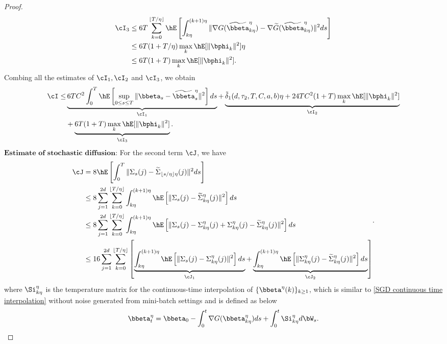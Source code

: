 \begin{proof}
\begin{equation}
    \begin{split}
   \cI_3  &\le  6T\sum_{k=0}^{\lfloor T/\eta \rfloor} \hE\left[\int_{k\eta}^{(k+1)\eta}\|\nabla  G(\widetilde \bbeta^{\eta}_{k\eta})-\nabla \widetilde G(\widetilde \bbeta^{\eta}_{k\eta})\|^2ds \right]\\
   &\le 6T (1+T/\eta)\max_{k}\hE[ \|\bphi_k\|^2]\eta\\
   &\le 6T (1+T)\max_{k}\hE[ \|\bphi_k\|^2].
    \end{split}{}
\end{equation}{}
Combing all the estimates of $\cI_1,\cI_2$ and $\cI_3$, we obtain
\begin{equation}
    \begin{split}
        \cI\le& \underbrace{6TC^2\int_0^T\hE\left[\sup_{0\le s\le T}\|\bbeta_s-\widetilde \bbeta^{\eta}_s\|^2\right]ds}_{\cI_1}+\underbrace{\tilde \delta_1(d, \tau_2, T, C, a, b) \eta+ 24TC^2(1+T)\max_{k}\hE[\|\bphi_k\|^2]}_{\cI_2}\\
        &+\underbrace{6T (1+T)\max_{k}\hE[ \|\bphi_k\|^2]}_{\cI_3}.\\
    \end{split}{}
\end{equation}{}
\noindent
$\textbf{Estimate of stochastic diffusion:}$
For the second term $\cJ$, we have 
\begin{equation}
	\begin{split}
		\cJ&=8\hE\left[\int_{0}^{T} \|\Sigma_s(j)-\widetilde \Sigma_{{\lfloor s/\eta \rfloor}\eta}(j)\|^2 ds\right] \\
		& \leq 8\sum_{j=1}^{2d}\sum_{k=0}^{{\lfloor T/\eta \rfloor}}\int_{k \eta}^{(k+1)\eta}\hE\left[\|\Sigma_s(j)-\widetilde \Sigma^{\eta}_{k \eta}(j)\|^2\right]ds \\
		& \leq 8\sum_{j=1}^{2d}\sum_{k=0}^{{\lfloor T/\eta \rfloor}}\int_{k \eta}^{(k+1)\eta}\hE\left[\|\Sigma_s(j)- \Sigma_{k \eta}^{\eta}(j)+\Sigma_{k \eta}^{\eta}(j)-\widetilde \Sigma_{k \eta}^{\eta}(j)\|^2\right]ds \\
		& \leq 16\sum_{j=1}^{2d}\sum_{k=0}^{{\lfloor T/\eta \rfloor}}\left[\underbrace{\int_{k \eta}^{(k+1)\eta}\hE\left[\|\Sigma_s(j)- \Sigma_{k \eta}^{\eta}(j)\|^2\right]ds}_{\cJ_1}+\underbrace{\int_{k \eta}^{(k+1)\eta}\hE\left[\|\Sigma_{k \eta}^{\eta}(j)-\widetilde \Sigma_{k \eta}^{\eta}(j)\|^2\right]ds}_{\cJ_2}\right] 
	\end{split}.
\end{equation}
where $\Si_{k \eta}^{\eta}$ is the temperature matrix for the continuous-time interpolation of $\{\bbeta^{\eta}(k)\}_{k\ge 1}$, which is similar to \eqref{SGD continuous time interpolation} without noise generated from mini-batch settings and is defined as below
\begin{equation}
	 \bbeta_t^{\eta}= \bbeta_0-\int_0^t\nabla  G( \bbeta^{\eta}_{k\eta})ds+\int_0^t\Si^{\eta}_{k \eta}d\bW_s.
\end{equation}


\end{proof}
